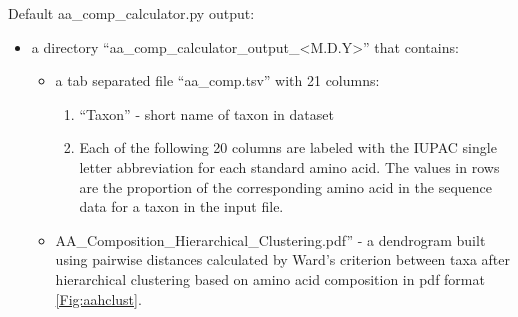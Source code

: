 \documentclass{article}
\begin{document}
\begin{description}
        \vspace{0.2cm}
            \begin{description}
                \item Default aa\_comp\_calculator.py output:
                \begin{itemize}
                    \item a directory “aa\_comp\_calculator\_output\_<M.D.Y>” that contains:
                    \begin{itemize}
                        \item a tab separated file “aa\_comp.tsv” with 21 columns:
                        \begin{enumerate}[label=\arabic*.]
                            \item “Taxon” - short name of taxon in dataset
                            \item Each of the following 20 columns are labeled with the IUPAC single letter abbreviation for each standard amino acid. The values in rows are the proportion of the corresponding amino acid in the sequence data for a taxon in the input file.
                        \end{enumerate}
                        \item AA\_Composition\_Hierarchical\_Clustering.pdf” - a dendrogram built using pairwise distances calculated by Ward’s criterion between taxa after hierarchical clustering based on amino acid composition in pdf format \autoref{Fig:aahclust}.
                    \end{itemize}
                \end{itemize}
            \end{description}
        \end{description} 
        
\end{document}
